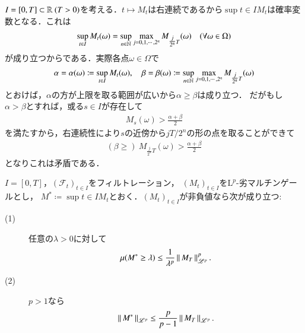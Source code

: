 	$I = [0,T] \subset \mathbb{R}\ (T > 0)$を考える．$t \longmapsto M_t$は右連続であるから$\sup{t \in I}{M_t}$は確率変数となる．これは
	\begin{align}
		\operatorname*{sup}_{t \in I} M_t(\omega) = \operatorname*{sup}_{n \in \mathbb{N}} \operatorname*{max}_{j=0,1,\cdots,2^n} M_{\tfrac{j}{2^n}T}(\omega) \quad (\forall \omega \in \Omega)
	\end{align}
	が成り立つからである．実際各点$\omega \in \Omega$で
	\begin{align}
		\alpha = \alpha(\omega) \coloneqq \operatorname*{sup}_{t \in I} M_t(\omega),
		\quad \beta = \beta(\omega) \coloneqq \operatorname*{sup}_{n \in \mathbb{N}} \operatorname*{max}_{j=0,1,\cdots,2^n} M_{\tfrac{j}{2^n}T}(\omega)
	\end{align}
	とおけば，$\alpha$の方が上限を取る範囲が広いから$\alpha \geq \beta$は成り立つ．
	だがもし$\alpha > \beta$とすれば，或る$s \in I$が存在して
	\begin{align}
		M_s(\omega) > \frac{\alpha + \beta}{2}
	\end{align}
	を満たすから，右連続性により$s$の近傍から$jT/2^n$の形の点を取ることができて
	\begin{align}
		(\beta \geq)\ M_{\tfrac{j}{2^n}T}(\omega) > \frac{\alpha + \beta}{2}
	\end{align}
	となりこれは矛盾である．
	
	\begin{itembox}[l]{}
		\begin{thm}[Doobの不等式(2)]
			$I=[0,T]$，$(\mathcal{F}_t)_{t \in I}$をフィルトレーション，
			$(M_t)_{t \in I}$を$\mathrm{L}^p$-劣マルチンゲールとし，
			$M^* \coloneqq \sup{t \in I}{M_t}$とおく．$(M_t)_{t \in I}$が非負値なら次が成り立つ:
			\begin{description}
				\item[(1)] 任意の$\lambda > 0$に対して
					\begin{align}
						\mu(M^* \geq \lambda) \leq \frac{1}{\lambda^p} \left\|\, M_T\, \right\|_{\mathscr{L}^p}^p.
					\end{align}
				\item[(2)] $p > 1$なら
					\begin{align}
						\left\|\, M^*\, \right\|_{\mathscr{L}^p} \leq \frac{p}{p-1} \left\|\, M_T\, \right\|_{\mathscr{L}^p}.
					\end{align}
			\end{description}
		\end{thm}
	\end{itembox}
	
